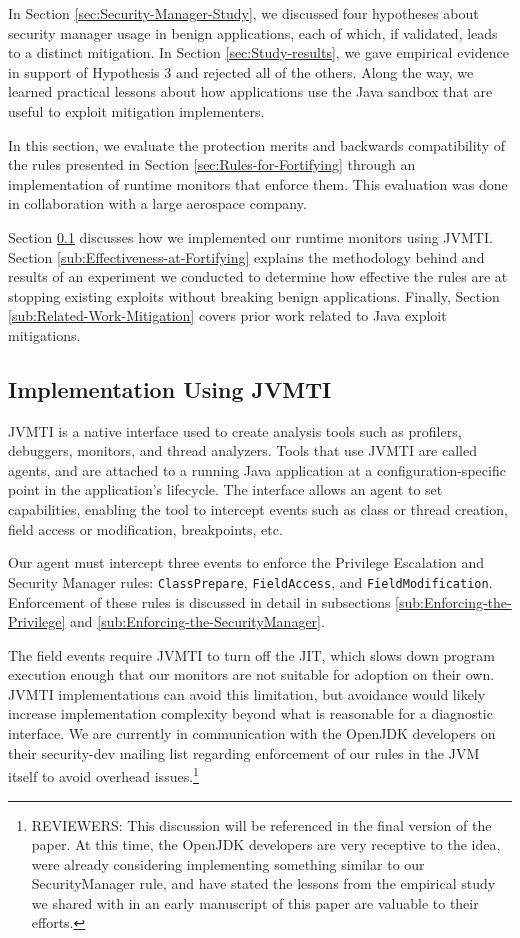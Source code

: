 \documentclass{sig-alternate}
\begin{document}
In Section \ref{sec:Security-Manager-Study}, we discussed four hypotheses about security manager usage in benign applications, each
of which, if validated, leads to a distinct mitigation. In Section
\ref{sec:Study-results}, we gave empirical evidence in support of
Hypothesis 3 and rejected all of the others. Along the way, we learned
practical lessons about how applications use the Java sandbox that
are useful to exploit mitigation implementers. 

In this section, we evaluate the protection merits and backwards compatibility of the rules presented in Section \ref{sec:Rules-for-Fortifying} through an implementation of runtime monitors that enforce them. This evaluation was done in collaboration
with a large aerospace company.

Section \ref{sub:Implementation-Using-JVMTI} discusses how we implemented
our runtime monitors using JVMTI. Section \ref{sub:Effectiveness-at-Fortifying}
explains the methodology behind and results of an experiment we conducted
to determine how effective the rules are at stopping existing exploits without breaking benign applications. Finally, Section
\ref{sub:Related-Work-Mitigation} covers prior work related to Java exploit mitigations.

\subsection{Implementation Using JVMTI}\label{sub:Implementation-Using-JVMTI}

JVMTI is a native interface used to create
analysis tools such as profilers, debuggers, monitors, and thread
analyzers. Tools that use JVMTI are called agents, and are attached
to a running Java application at a configuration-specific point in
the application's lifecycle. The interface allows an agent to set
capabilities, enabling the tool to intercept events such as class
or thread creation, field access or modification, breakpoints, etc.

Our agent must intercept three events to enforce the Privilege Escalation
and Security Manager rules: \texttt{ClassPrepare}, \texttt{FieldAccess},
and \texttt{FieldModification}. Enforcement of these rules is discussed
in detail in subsections \ref{sub:Enforcing-the-Privilege} and \ref{sub:Enforcing-the-SecurityManager}.

The field events require JVMTI to turn off the JIT, which slows down program execution enough that our monitors are not suitable for adoption on their own. JVMTI implementations can avoid this limitation, but avoidance would likely increase implementation complexity beyond what is reasonable for a diagnostic interface. We are currently in communication with the OpenJDK developers on their security-dev mailing list regarding enforcement of our rules in the JVM itself to avoid overhead issues.\footnote{REVIEWERS: This discussion will be referenced in the final version of the paper. At this time, the OpenJDK developers are very receptive to the idea, were already considering implementing something similar to our SecurityManager rule, and have stated the lessons from the empirical study we shared with in an early manuscript of this paper are valuable to their efforts.}
\end{document}
